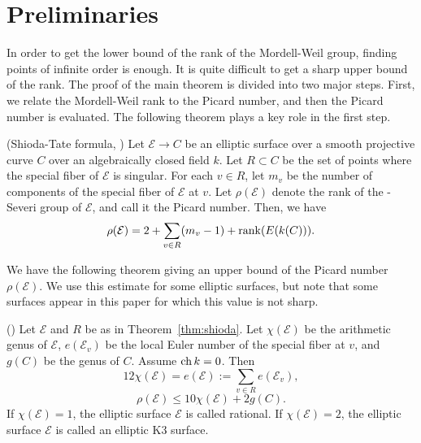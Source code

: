 \documentclass[main]{subfiles}
\begin{document}
\section{Preliminaries}

In order to get the lower bound of the rank of the Mordell-Weil group, finding points of infinite order is enough.
It is quite difficult to get a sharp upper bound of the rank.
The proof of the main theorem is divided into two major steps.
First, we relate the Mordell-Weil rank to the Picard number, and then the Picard number is evaluated.
The following theorem plays a key role in the first step.
\begin{thm}{(Shioda-Tate formula, \cite[Corollary 5.3]{ref:shioda1990})}
    \label{thm:shioda}
    Let $\mathcal{E} \to C$ be an elliptic surface over a smooth projective curve $C$ over an algebraically closed field $k$.
    Let $R \subset C$ be the set of points where the special fiber of $\mathcal{E}$ is singular.
    For each $v \in R$, let $m_{v}$ be the number of components of the special fiber of $\mathcal{E}$ at $v$.
    Let $\rho(\mathcal{E})$ denote the rank of the \Neron-Severi group of $\mathcal{E}$, and call it the Picard number.
    Then, we have
    \begin{equation*}
        \rho (\mathcal{E}) = 2 + \sum_{v \in R} (m_{v} - 1) + \operatorname{rank}(E(k(C))).
    \end{equation*}
\end{thm}

We have the following theorem giving an upper bound of the Picard number $\rho(\mathcal{E})$.
We use this estimate for some elliptic surfaces, but note that some surfaces appear in this paper for which this value is not sharp.
\begin{thm}{(\cite[Twierdzenie 2.2.9, 2.2.10, 2.2.19]{ref:naskreckiphd})}
    Let $\mathcal{E}$ and $R$ be as in Theorem~\ref{thm:shioda}.
    Let $\chi(\mathcal{E})$ be the arithmetic genus of $\mathcal{E}$, $e(\mathcal{E}_v)$ be the local Euler number of the special fiber at $v$, and $g(C)$ be the genus of $C$. \label{thm:rho}
    Assume $\operatorname{ch} k = 0$.
    Then
    \begin{equation*}
        12 \chi(\mathcal{E}) = e(\mathcal{E}) := \sum_{v \in R} e(\mathcal{E}_{v}),
    \end{equation*}
    \begin{equation*}
        \rho(\mathcal{E}) \leq 10 \chi(\mathcal{E}) + 2g(C).
    \end{equation*}
    If $\chi(\mathcal{E}) = 1$, the elliptic surface $\mathcal{E}$ is called rational.
    If $\chi(\mathcal{E}) = 2$, the elliptic surface $\mathcal{E}$ is called an elliptic K3 surface.
\end{thm}
\end{document}
